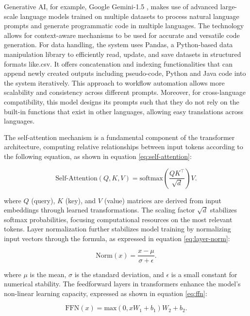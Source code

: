 \documentclass{dhbenelux}
\begin{document}
Generative AI, for example, Google Gemini-1.5 \cite{gemini2023}, makes use of advanced large-scale language models trained on multiple datasets to process natural language prompts and generate programmatic code in multiple languages. The technology allows for context-aware mechanisms to be used for accurate and versatile code generation. For data handling, the system uses Pandas, a Python-based data manipulation library to efficiently read, update, and save datasets in structured formats like.csv. It offers concatenation and indexing functionalities that can append newly created outputs including pseudo-code, Python and Java code into the system iteratively. This approach to workflow automation allows more scalability and consistency across different prompts. Moreover, for cross-language compatibility, this model designs its prompts such that they do not rely on the built-in functions that exist in other languages, allowing easy translations across languages.

The self-attention mechanism is a fundamental component of the transformer architecture, computing relative relationships between input tokens according to the following equation, as shown in equation \ref{eq:self-attention}:

\begin{equation}
\text{Self-Attention}(Q, K, V) = \text{softmax}\left(\frac{QK^\top}{\sqrt{d}}\right)V.
\label{eq:self-attention}
\end{equation}

where \( Q \) (query), \( K \) (key), and \( V \) (value) matrices are derived from input embeddings through learned transformations. The scaling factor \( \sqrt{d} \) stabilizes softmax probabilities, focusing computational resources on the most relevant tokens. Layer normalization further stabilizes model training by normalizing input vectors through the formula, as expressed in equation \ref{eq:layer-norm}:

\begin{equation}
\text{Norm}(x) = \frac{x - \mu}{\sigma + \epsilon}.
\label{eq:layer-norm}
\end{equation}

where \( \mu \) is the mean, \( \sigma \) is the standard deviation, and \( \epsilon \) is a small constant for numerical stability. The feedforward layers in transformers enhance the model’s non-linear learning capacity, expressed as shown in equation \ref{eq:ffn}:

\begin{equation}
\text{FFN}(x) = \text{max}(0, xW_1 + b_1)W_2 + b_2.
\label{eq:ffn}
\end{equation}
\end{document}
